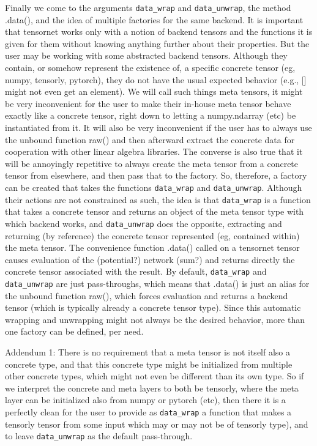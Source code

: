 \documentclass[12pt,letterpaper]{article}
\begin{document}
Finally we come to the arguments \texttt{data\_wrap} and \texttt{data\_unwrap}, the method .data(), and the idea of multiple
factories for the same backend.  It is important that tensornet works only with a notion of backend
tensors and the functions it is given for them without knowing anything further about their properties.
But the user may be working with some abstracted backend tensors.  Although they contain, or
somehow represent the existence of, a specific concrete tensor (eg, numpy, tensorly, pytorch), they 
do not have the usual expected behavior (e.g., [] might not even get an element).  We will call such 
things meta tensors, it might be very inconvenient for the user to make their in-house meta tensor behave 
exactly like a concrete tensor, right down to letting a numpy.ndarray (etc) be instantiated from it.  It
will also be very inconvenient if the user has to always use the unbound function raw() and then afterward
extract the concrete data for cooperation with other linear algebra libraries.  The converse is also true
that it will be annoyingly repetitive to always create the meta tensor from a concrete tensor from elsewhere,
and then pass that to the factory.  So, therefore, a factory can be created that takes the functions
\texttt{data\_wrap} and \texttt{data\_unwrap}.  Although their actions are not constrained as such, the idea is that \texttt{data\_wrap}
is a function that takes a concrete tensor and returns an object of the meta tensor type with which
backend works, and \texttt{data\_unwrap} does the opposite, extracting and returning (by reference) the concrete
tensor represented (eg, contained within) the meta tensor.  The convenience function .data() called
on a tensornet tensor causes evaluation of the (potential?) network (sum?) and returns directly the concrete
tensor associated with the result.  By default, \texttt{data\_wrap} and \texttt{data\_unwrap} are just pass-throughs,
which means that .data() is just an alias for the unbound function raw(), which forces evaluation and
returns a backend tensor (which is typically already a concrete tensor type).  Since this automatic
wrapping and unwrapping might not always be the desired behavior, more than one factory can be defined,
per need.

Addendum 1:  There is no requirement that a meta tensor is not itself also a concrete type, and that
this concrete type might be initialized from multiple other concrete types, which might not even be
different than its own type.  So if we interpret the concrete and meta layers to both be tensorly,
where the meta layer can be initialized also from numpy or pytorch (etc), then there it is a perfectly
clean for the user to provide as \texttt{data\_wrap} a function that makes a tensorly tensor from some input
which may or may not be of tensorly type), and to leave \texttt{data\_unwrap} as the default pass-through.
\end{document}

